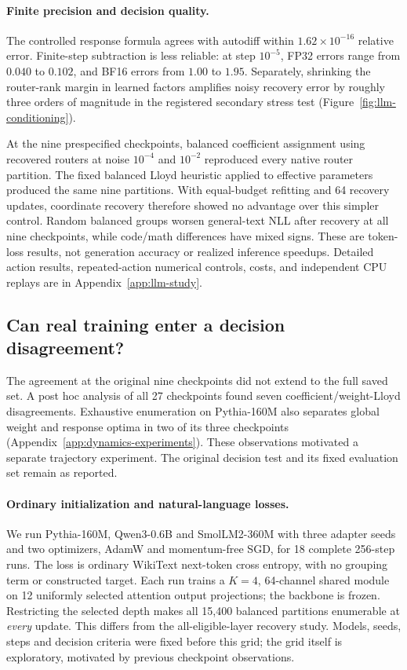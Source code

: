 \paragraph{Finite precision and decision quality.}
The controlled response formula agrees with autodiff within
$1.62\times10^{-16}$ relative error. Finite-step subtraction is less
reliable: at step $10^{-5}$, FP32 errors range from $0.040$ to $0.102$,
and BF16 errors from $1.00$ to $1.95$. Separately, shrinking the router-rank
margin in learned factors amplifies noisy recovery error by roughly three
orders of magnitude in the registered secondary stress test
(Figure~\ref{fig:llm-conditioning}).

At the nine prespecified checkpoints, balanced coefficient assignment
using recovered routers at noise $10^{-4}$ and $10^{-2}$ reproduced every
native router partition. The fixed balanced Lloyd heuristic applied to
effective parameters produced the same nine partitions. With equal-budget
refitting and 64 recovery updates, coordinate recovery therefore showed
no advantage over this simpler control. Random balanced
 groups worsen general-text NLL after recovery at all nine checkpoints,
while code/math differences have mixed signs. These are token-loss results,
not generation accuracy or realized inference speedups. Detailed action
results, repeated-action numerical controls, costs, and independent CPU
replays are in Appendix~\ref{app:llm-study}.


\subsection{Can real training enter a decision disagreement?}
\label{sec:training-crossings}

The agreement at the original nine checkpoints did not extend to the full
saved set. A post hoc analysis of all 27 checkpoints found seven
coefficient/weight-Lloyd disagreements. Exhaustive enumeration on
Pythia-160M also separates global weight and response optima in two of its
three checkpoints (Appendix~\ref{app:dynamics-experiments}). These observations motivated a separate trajectory experiment. The
original decision test and its fixed evaluation set remain as reported.

\paragraph{Ordinary initialization and natural-language losses.}
We run Pythia-160M, Qwen3-0.6B and SmolLM2-360M with three adapter seeds and
two optimizers, AdamW and momentum-free SGD, for 18 complete 256-step runs.
The loss is ordinary WikiText next-token cross entropy, with no grouping
term or constructed target. Each run trains a $K=4$, 64-channel shared
module on 12 uniformly selected attention output projections; the backbone
is frozen. Restricting the selected depth makes all 15,400 balanced
partitions enumerable at \emph{every} update. This differs from the
all-eligible-layer recovery study. Models, seeds, steps and decision criteria
were fixed before this grid; the grid itself is exploratory, motivated by
previous checkpoint observations.

